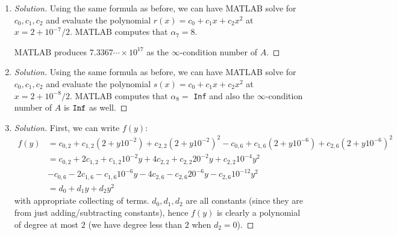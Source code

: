 \documentclass{article}
\begin{document}
\begin{enumerate}
\begin{proof}[Solution]
		MATLAB produces $3.5836\cdots \times 10^{15}$
		as the $\infty$-condition number of $A$.
	\end{proof}
	\item \begin{proof}[Solution]\let\qed\relax
		Using the same formula as before,
		we can have MATLAB solve for $c_0,c_1,c_2$ and evaluate the polynomial
		$r(x) = c_0 + c_1 x + c_2 x^2$ at $x = 2 + 10^{-7}/2$.
		MATLAB computes that $\alpha_7 = 8$.

		MATLAB produces $7.3367\cdots \times 10^{17}$
		as the $\infty$-condition number of $A$.
	\end{proof}
	\item \begin{proof}[Solution]\let\qed\relax
		Using the same formula as before,
		we can have MATLAB solve for $c_0,c_1,c_2$ and evaluate the polynomial
		$s(x) = c_0 + c_1 x + c_2 x^2$ at $x = 2 + 10^{-8}/2$.
		MATLAB computes that $\alpha_8 =$ \verb|Inf|
		and also the $\infty$-condition number of $A$ is $\verb|Inf|$ as well.
	\end{proof}
	\item \begin{proof}[Solution]\let\qed\relax
		First, we can write $f(y)$:
		\begin{align*}
			f(y)
			&= c_{0,2} + c_{1,2}(2 + y10^{-2}) + c_{2,2}(2 + y10^{-2})^2
			- c_{0,6} + c_{1,6}(2 + y10^{-6}) + c_{2,6}(2 + y10^{-6})^2\\
			&= c_{0,2} + 2c_{1,2} + c_{1,2} 10^{-2}y
			+ 4c_{2,2} + c_{2,2}20^{-2}y + c_{2,2}10^{-4}y^2\\
			&- c_{0,6} - 2c_{1,6} - c_{1,6} 10^{-6}y
			- 4c_{2,6} - c_{2,6}20^{-6}y - c_{2,6}10^{-12}y^2\\
			&= d_0 + d_1y + d_2y^2
		\end{align*}
		with appropriate collecting of terms.
		$d_0,d_1,d_2$ are all constants (since they are from just adding/subtracting constants),
		hence $f(y)$ is clearly a polynomial of degree at most $2$
		(we have degree less than $2$ when $d_2 = 0$).
		

\end{proof}
\end{enumerate}
\end{document}
